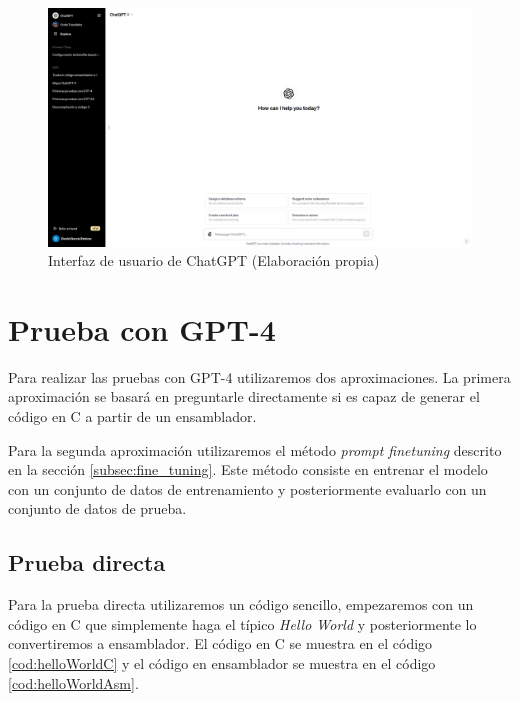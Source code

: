 \begin{figure}[H]
    \begin{center}
      \includegraphics[scale=0.3]{figuras/Capitulo_05/InterfazChatGPT.png}
    \end{center}
    \caption[Interfaz de usuario de ChatGPT]{Interfaz de usuario de ChatGPT (Elaboración propia)}
    \label{fig:interfaz_chatgpt}
\end{figure}

\section{Prueba con GPT-4}
\label{sec:prueba_gpt4}


Para realizar las pruebas con GPT-4 utilizaremos dos aproximaciones. La primera aproximación
se basará en preguntarle directamente si es capaz de generar el código en C a partir de un
ensamblador.

Para la segunda aproximación utilizaremos el método \textit{prompt finetuning} descrito en
la sección \ref{subsec:fine_tuning}. Este método consiste en entrenar el modelo con un conjunto
de datos de entrenamiento y posteriormente evaluarlo con un conjunto de datos de prueba.

\subsection{Prueba directa}
\label{subsec:prueba_directa}


Para la prueba directa utilizaremos un código sencillo, empezaremos con un código en C
que simplemente haga el típico \textit{Hello World} y posteriormente lo convertiremos a
ensamblador. El código en C se muestra en el código \ref{cod:helloWorldC} y el código
en ensamblador se muestra en el código \ref{cod:helloWorldAsm}.

